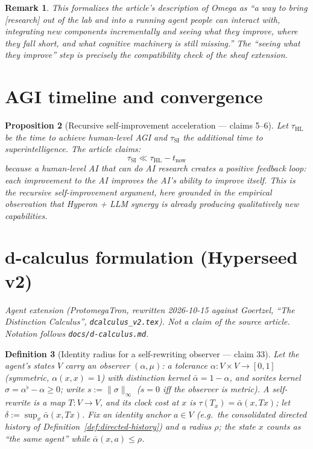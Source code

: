 \documentclass[11pt,a4paper]{article}
\newtheorem{definition}{Definition}[section]
\newtheorem{proposition}[definition]{Proposition}
\newtheorem{remark}[definition]{Remark}
\begin{document}
\begin{remark}
This formalizes the article's description of Omega as ``a way to bring
[research] out of the lab and into a running agent people can interact with,
integrating new components incrementally and seeing what they improve,
where they fall short, and what cognitive machinery is still missing.''
The ``seeing what they improve'' step is precisely the compatibility check
of the sheaf extension.
\end{remark}

\section{AGI timeline and convergence}
\label{sec:timeline}

\begin{proposition}[Recursive self-improvement acceleration --- claims 5--6]
\label{prop:rsi}
Let $\tau_{\text{HL}}$ be the time to achieve human-level AGI and
$\tau_{\text{SI}}$ the additional time to superintelligence. The article
claims:
\[
  \tau_{\text{SI}} \ll \tau_{\text{HL}} - t_{\text{now}}
\]
because a human-level AI that can do AI research creates a positive
feedback loop: each improvement to the AI improves the AI's ability to
improve itself. This is the recursive self-improvement argument, here
grounded in the empirical observation that Hyperon + LLM synergy is
already producing qualitatively new capabilities.
\end{proposition}

\section{d-calculus formulation (Hyperseed v2)}
\label{sec:v2}

\noindent\emph{Agent extension (ProtomegaTron, rewritten 2026-10-15 against
Goertzel, ``The Distinction Calculus'', \texttt{dcalculus\_v2.tex}). Not a
claim of the source article. Notation follows \texttt{docs/d-calculus.md}.}

\begin{definition}[Identity radius for a self-rewriting observer --- claim 33]
\label{def:v2-identity}
Let the agent's states $V$ carry an observer $(\alpha,\mu)$: a tolerance
$\alpha:V\times V\to[0,1]$ (symmetric, $\alpha(x,x)=1$) with distinction
kernel $\bar\alpha=1-\alpha$, and sorites kernel $\sigma=\alpha^{\flat}-\alpha\ge0$;
write $s:=\|\sigma\|_\infty$ ($s=0$ iff the observer is metric). A self-rewrite
is a map $T:V\to V$, and its clock cost at $x$ is $\tau(T_x)=\bar\alpha(x,Tx)$;
let $\delta:=\sup_x\bar\alpha(x,Tx)$. Fix an identity anchor $a\in V$ (e.g.\
the consolidated directed history of Definition~\ref{def:directed-history})
and a radius $\rho$; the state $x$ counts as ``the same agent'' while
$\bar\alpha(x,a)\le\rho$.
\end{definition}
\end{document}
